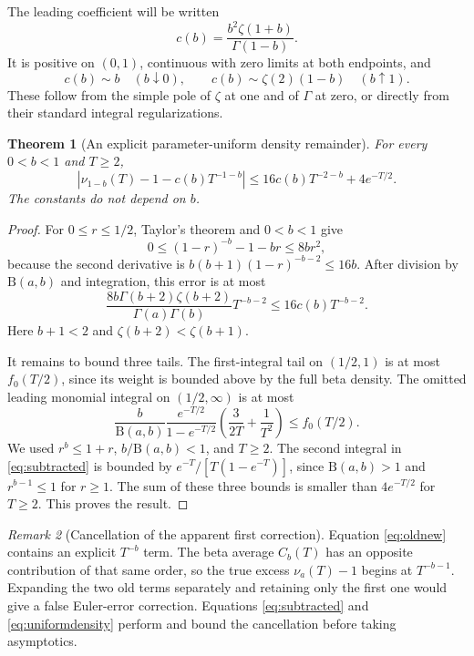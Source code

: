 \documentclass[11pt]{article}
\numberwithin{equation}{section}
\newtheorem{theorem}{Theorem}[section]
\theoremstyle{definition}\newtheorem{definition}[theorem]{Definition}
\theoremstyle{remark}\newtheorem{remark}[theorem]{Remark}
\newcommand{\BB}{\mathrm B}
\begin{document}
The leading coefficient will be written
\begin{equation}\label{eq:cb}
 c(b)=\frac{b^2\zeta(1+b)}{\Gamma(1-b)}.
\end{equation}
It is positive on $(0,1)$, continuous with zero limits at both
endpoints, and
\begin{equation}\label{eq:cbends}
 c(b)\sim b\quad(b\downarrow0),\qquad
 c(b)\sim\zeta(2)(1-b)\quad(b\uparrow1).
\end{equation}
These follow from the simple pole of $\zeta$ at one and of $\Gamma$
at zero, or directly from their standard integral regularizations.

\begin{theorem}[An explicit parameter-uniform density remainder]
\label{thm:uniformdensity}
For every $0<b<1$ and $T\ge2$,
\begin{equation}\label{eq:uniformdensity}
 \left|\nu_{1-b}(T)-1-c(b)T^{-1-b}\right|
 \le16c(b)T^{-2-b}+4e^{-T/2}.
\end{equation}
The constants do not depend on $b$.
\end{theorem}
\begin{proof}
For $0\le r\le1/2$, Taylor's theorem and $0<b<1$ give
\[
 0\le(1-r)^{-b}-1-br\le8br^2,
\]
because the second derivative is
$b(b+1)(1-r)^{-b-2}\le16b$. After division by $\BB(a,b)$ and
integration, this error is at most
\[
 \frac{8b\Gamma(b+2)\zeta(b+2)}{\Gamma(a)\Gamma(b)}T^{-b-2}
 \le16c(b)T^{-b-2}.
\]
Here $b+1<2$ and $\zeta(b+2)<\zeta(b+1)$.

It remains to bound three tails. The first-integral tail on
$(1/2,1)$ is at most $f_0(T/2)$, since its weight is bounded above
by the full beta density. The omitted leading monomial integral
on $(1/2,\infty)$ is at most
\[
 \frac{b}{\BB(a,b)}\frac{e^{-T/2}}{1-e^{-T/2}}
 \left(\frac{3}{2T}+\frac1{T^2}\right)
 \le f_0(T/2).
\]
We used $r^b\le1+r$, $b/\BB(a,b)<1$, and $T\ge2$.
The second integral in \eqref{eq:subtracted} is bounded by
$e^{-T}/[T(1-e^{-T})]$, since $\BB(a,b)>1$ and $r^{b-1}\le1$
for $r\ge1$. The sum of these three bounds is smaller than
$4e^{-T/2}$ for $T\ge2$. This proves the result.
\end{proof}

\begin{remark}[Cancellation of the apparent first correction]
Equation \eqref{eq:oldnew} contains an explicit $T^{-b}$ term.
The beta average $C_b(T)$ has an opposite contribution of that same
order, so the true excess $\nu_a(T)-1$ begins at $T^{-b-1}$.
Expanding the two old terms separately and retaining only the first
one would give a false Euler-error correction. Equations
\eqref{eq:subtracted} and \eqref{eq:uniformdensity} perform and bound
the cancellation before taking asymptotics.
\end{remark}
\end{document}
